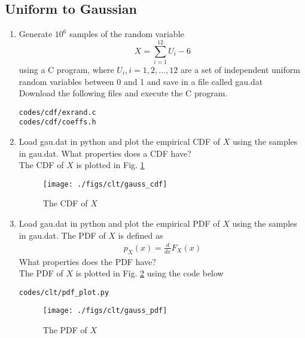 \subsection{Uniform to Gaussian}
\begin{enumerate}[label=\thesubsection.\arabic*
,ref=\thesection.\theenumi]

\item
Generate $10^6$ samples of the random variable
%
\begin{equation}
X = \sum_{i=1}^{12}U_i -6
\end{equation}
%
using a C program, where $U_i, i = 1,2,\dots, 12$ are  a set of independent uniform random variables between 0 and 1
and save in a file called gau.dat
\\
\solution Download the following files and execute the  C program.
\begin{lstlisting}
codes/cdf/exrand.c
codes/cdf/coeffs.h
\end{lstlisting}

%
\item
Load gau.dat in python and plot the empirical CDF of $X$ using the samples in gau.dat. What properties does a CDF have?
\\
\solution The CDF of $X$ is plotted in Fig. \ref{fig:gauss_cdf}
\begin{figure}
\centering
\texttt{[image: ./figs/clt/gauss\_cdf]}
\caption{The CDF of $X$}
\label{fig:gauss_cdf}
\end{figure}


\item
Load gau.dat in python and plot the empirical PDF of $X$ using the samples in gau.dat. The PDF of $X$ is defined as
\begin{align}
p_{X}(x) = \frac{d}{dx}F_{X}(x)
\end{align}
What properties does the PDF have?
\\
\solution The PDF of $X$ is plotted in Fig. \ref{fig:gauss_pdf} using the code below
\begin{lstlisting}
codes/clt/pdf_plot.py
\end{lstlisting}

\begin{figure}
\centering
\texttt{[image: ./figs/clt/gauss\_pdf]}
\caption{The PDF of $X$}
\label{fig:gauss_pdf}
\end{figure}


\end{enumerate}
